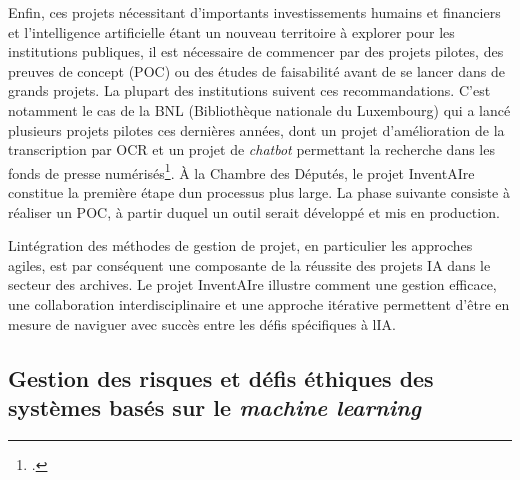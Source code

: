 Enfin, ces projets nécessitant d'importants investissements humains et
financiers et l'intelligence artificielle étant un nouveau territoire à
explorer pour les institutions publiques, il est nécessaire de commencer
par des projets pilotes, des preuves de concept (POC) ou des études de
faisabilité avant de se lancer dans de grands projets. La plupart des
institutions suivent ces recommandations. C'est notamment le cas de la
BNL (Bibliothèque nationale du Luxembourg) qui a lancé plusieurs projets pilotes ces dernières années, dont un
projet d'amélioration de la transcription par \gls{OCR} et un projet de \emph{chatbot} permettant la recherche
dans les fonds de presse numérisés\footcite{noauthor_comment_nodate}. À la Chambre des Députés, le projet InventAIre constitue
la première étape d\textquotesingle un processus plus large. La phase
suivante consiste à réaliser un POC, à partir duquel un outil serait
développé et mis en production.

L\textquotesingle intégration des méthodes de gestion de projet, en
particulier les approches agiles, est par conséquent une composante de la réussite des
projets IA dans le secteur des archives. Le projet InventAIre illustre
comment une gestion efficace, une collaboration interdisciplinaire et
une approche itérative permettent d'être en mesure de naviguer avec succès entre les défis spécifiques à l\textquotesingle IA.

\subsection{Gestion des risques et défis éthiques des systèmes	basés sur le \emph{machine learning}}

